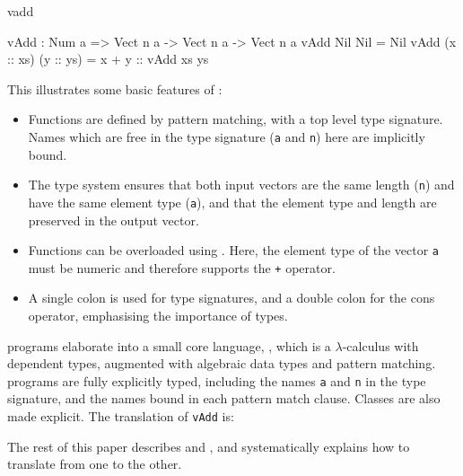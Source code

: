 \begin{SaveVerbatim}{vadd}

vAdd : Num a => Vect n a -> Vect n a -> Vect n a
vAdd Nil       Nil       = Nil
vAdd (x :: xs) (y :: ys) = x + y :: vAdd xs ys

\end{SaveVerbatim}

\noindent
This illustrates some basic features of \Idris{}:

\begin{itemize}
\item Functions are defined by pattern matching, with a top level type signature.
Names which are free in the type signature (\texttt{a} and \texttt{n}) here
are implicitly bound.
\item The type system ensures that both input vectors are the same length (\texttt{n})
and have the same element type (\texttt{a}), and that the element type and length
are preserved in the output vector.
\item Functions can be overloaded using . Here, the element type
of the vector \texttt{a} must be numeric and therefore supports the \texttt{+} operator.
\item A single colon is used for type signatures, and a double colon for the
cons operator, emphasising the importance of types.
\end{itemize}

\noindent
\Idris{} programs elaborate into a small core language, \TT{}, which is a $\lambda$-calculus
with dependent types, augmented with algebraic data types and pattern matching.
\TT{} programs are fully explicitly typed, including the names \texttt{a} and \texttt{n}
in the type signature, and the names bound in each pattern match clause.
Classes are also made explicit.
The \TT{} translation of \texttt{vAdd} is:


\noindent
The rest of this paper describes \Idris{} and \TT{}, and systematically explains
how to translate from one to the other.

